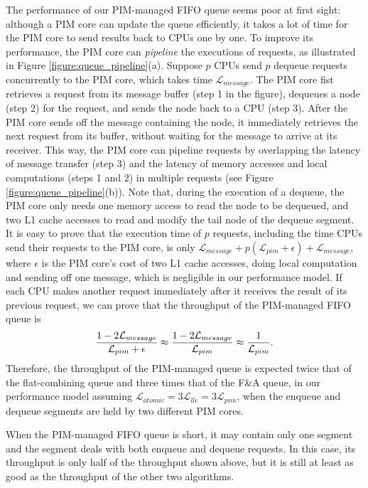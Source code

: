 \documentclass[11pt]{article}
\newcommand{\latpim} {\mathcal{L}_{pim}}
\newcommand{\latllc} {\mathcal{L}_{llc}}
\newcommand{\latato} {\mathcal{L}_{atomic}}
\newcommand{\latmes} {\mathcal{L}_{message}}
\begin{document}
The performance of our PIM-managed FIFO queue seems poor at first sight: although a PIM core can update 
the queue efficiently, it takes a lot of time for the PIM core to send results back to CPUs one by one. 
To improve its performance, the PIM core can \textit{pipeline} the executions of requests, 
as illustrated in Figure \ref{figure:queue_pipeline}(a). 
Suppose $p$ CPUs send $p$ dequeue requests concurrently to the PIM core, which takes time $\latmes$. 
The PIM core fist retrieves a request from its message buffer (step 1 in the figure), 
dequeues a node (step 2) for the request, and sends the node back to a CPU (step 3). 
After the PIM core sends off the message containing the node, it immediately retrieves the next 
request from its buffer, without waiting for the message to arrive at its receiver. 
This way, the PIM core can pipeline requests by overlapping the latency of message transfer (step 3) 
and the latency of memory accesses and local computations (steps 1 and 2) in multiple requests 
(see Figure \ref{figure:queue_pipeline}(b)). 
Note that, during the execution of a dequeue, the PIM core only needs one memory access to read the node 
to be dequeued, and two L1 cache accesses to read and modify the tail node of the dequeue segment.  
It is easy to prove that the execution time of $p$ requests, including the time CPUs send 
their requests to the PIM core, is only $\latmes + p(\latpim + \epsilon) + \latmes$, where $\epsilon$ 
is the PIM core's cost of two L1 cache accesses, doing local computation and sending off one message, 
which is negligible in our performance model. 
If each CPU makes another request immediately after it receives the result of its previous request, 
we can prove that the throughput of the PIM-managed FIFO queue is 
$${1 - 2\latmes \over \latpim + \epsilon} \approx {1 - 2\latmes \over \latpim} 
\approx {1 \over \latpim}.$$
Therefore, the throughput of the PIM-managed queue is expected twice that of the flat-combining queue
and three times that of the F\&A queue, in our performance model assuming $\latato = 3\latllc = 3\latpim$, 
when the enqueue and dequeue segments are held by two different PIM cores. 

When the PIM-managed FIFO queue is short, it may contain only one segment and 
the segment deals with both enqueue and dequeue requests. 
In this case, its throughput is only half of the throughput shown above, 
but it is still at least as good as the throughput of the other two algorithms. 
\end{document}
